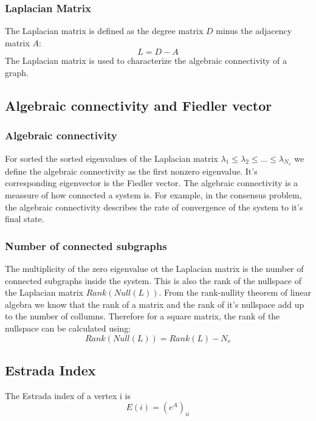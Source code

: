 \documentclass[a4paper,twoside, openright,12pt]{report}
\begin{document}
\subsubsection{Laplacian Matrix}
The Laplacian matrix is defined as the degree matrix $D$ minus the adjacency matrix $A$:
\begin{equation}
 L = D - A
\end{equation} 
The Laplacian matrix is used to characterize the algebraic connectivity of a graph.

\subsection{Algebraic connectivity and Fiedler vector}
\subsubsection{Algebraic connectivity}
For sorted the sorted eigenvalues of the Laplacian matrix
$ \lambda_1 \leq \lambda_2 \leq \ldots \leq \lambda_{N_v} $
we define the algebraic connectivity as the first nonzero eigenvalue. It's corresponding eigenvector is the Fiedler vector.
The algebraic connectivity is a meassure of how connected a system is. For example, in the consensus problem, the algebraic connectivity describes the rate of convergence of the system to it's final state. 

\subsubsection{Number of connected subgraphs}
The multiplicity of the zero eigenvalue ot the Laplacian matrix is the number of connected subgraphs inside the system. This is also the rank of the nullspace of the Laplacian matrix
$Rank( {Null}(L)) $.
From the rank-nullity theorem of linear algebra we know that the rank of a matrix and the rank of it's nullspace add up to the number of collumns. Therefore for a square matrix, the rank of the nullspace can be calculated using:
 \begin{equation}
 Rank( {Null}(L) ) = Rank(L) - N_v
\end{equation} 

\subsection{Estrada Index}

The Estrada index of a vertex i is  \cite{Estrada}
\begin{equation}
E(i) = {(e^{A})_{ii}}
\end{equation} 
\end{document}
